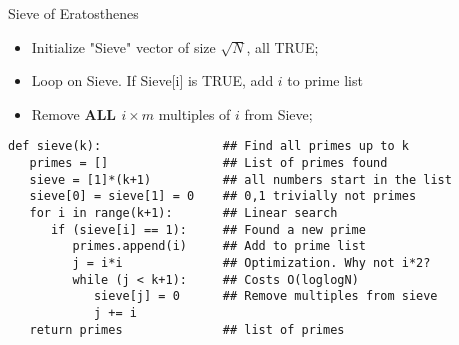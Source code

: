 \begin{frame}[fragile]{Sieve of Eratosthenes}

    \begin{block}{}
      \begin{itemize}
      \item Initialize "Sieve" vector of size $\sqrt{N}$, all TRUE;
      \item Loop on Sieve. If Sieve[i] is TRUE, add $i$ to prime list
      \item Remove {\bf ALL $i\times m$} multiples of $i$ from Sieve;
      \end{itemize}
    \end{block}

    {\smaller
  \begin{exampleblock}{}
\begin{verbatim}
def sieve(k):                 ## Find all primes up to k
   primes = []                ## List of primes found
   sieve = [1]*(k+1)          ## all numbers start in the list
   sieve[0] = sieve[1] = 0    ## 0,1 trivially not primes
   for i in range(k+1):       ## Linear search
      if (sieve[i] == 1):     ## Found a new prime
         primes.append(i)     ## Add to prime list
         j = i*i              ## Optimization. Why not i*2?
         while (j < k+1):     ## Costs O(loglogN)
            sieve[j] = 0      ## Remove multiples from sieve
            j += i
   return primes              ## list of primes
\end{verbatim}
  \end{exampleblock}
  }
\end{frame}

